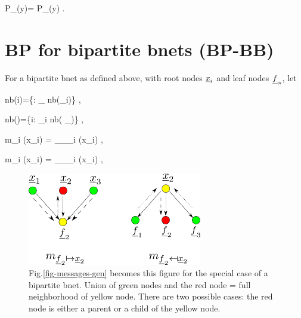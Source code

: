 \beq\color{blue}
P_\rvy(y)= P_\rvA(y)
\;.
\eeq


\section*{BP for
bipartite bnets (BP-BB)}
For
a bipartite
bnet as defined above,
with
root nodes ${\underline{x}}_i$
and leaf nodes ${\underline{f}}_\alpha$,
let


\beq
nb(i)=\{\alp: \rvf_\alpha\in
nb(\rvx_i)\}
\;,
\eeq

\beq
nb(\alpha)=\{i: \rvx_i\in
nb( \rvf_\alpha)\}
\;,
\eeq

\beq
m_{\alp\ldart i}
(x_i)
=
\pi_{\rvf_\alpha \ldart\rvx_i }
(x_i)
\;,
\eeq

\beq
m_{\alp\rdart i}
(x_i)
=
\lam_{\rvf_\alp\rdart \rvx_i}
(x_i)
\;,
\eeq


\begin{figure}[h!]
\centering
\includegraphics[width=3in]
{mpass/mpass-messages-bip.png}
\caption{
Fig.\ref{fig-messages-gen}
becomes this figure
for the special case of a
bipartite bnet. Union of green nodes and the red node = full
 neighborhood of yellow node.
There are two possible
cases:  the
red node is either a parent
or a child  of the yellow
node.}
\label{fig-messages-bip}
\end{figure}

